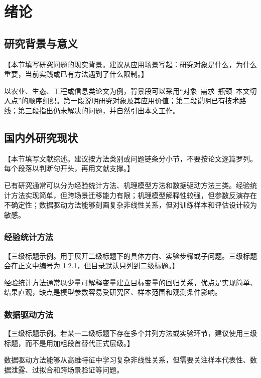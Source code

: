 \section{绪论}\label{ch:intro}

\subsection{研究背景与意义}

【本节填写研究问题的现实背景。建议从应用场景写起：研究对象是什么，为什么重要，当前实践或已有方法遇到了什么限制。】

以农业、生态、工程或信息类论文为例，背景段可以采用“对象--需求--瓶颈--本文切入点”的顺序组织。第一段说明研究对象及其应用价值；第二段说明已有技术路线；第三段指出仍未解决的问题，并自然引出本文工作。

\subsection{国内外研究现状}

【本节填写文献综述。建议按方法类别或问题链条分小节，不要按论文逐篇罗列。每个段落以判断句开头，再用文献支撑。】

已有研究通常可以分为经验统计方法、机理模型方法和数据驱动方法三类。经验统计方法实现简单，但跨场景迁移能力有限；机理模型解释性较强，但参数反演存在不确定性；数据驱动方法能够刻画复杂非线性关系，但对训练样本和评估设计较为敏感\citep{breiman2001random,verrelst2015optical}。

\subsubsection{经验统计方法}

【三级标题示例。用于展开二级标题下的具体方向、实验步骤或子问题。三级标题会在正文中编号为 1.2.1，但目录默认只列到二级标题。】

经验统计方法通常以少量可解释变量建立目标变量的回归关系，优点是实现简单、结果直观，缺点是模型参数容易受研究区、样本范围和观测条件影响。

\subsubsection{数据驱动方法}

【三级标题示例。若某一二级标题下存在多个并列方法或实验环节，建议使用三级标题，而不是用加粗段首替代正式层级。】

数据驱动方法能够从高维特征中学习复杂非线性关系，但需要关注样本代表性、数据泄露、过拟合和跨场景验证等问题。

